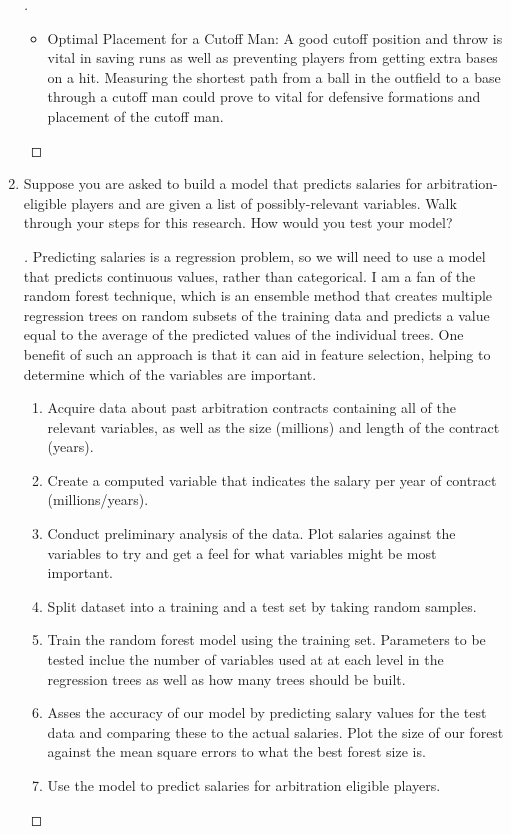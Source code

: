 \documentclass[]{article}
\theoremstyle{definition}
\begin{document}
\begin{enumerate}
\begin{proof}[\unskip\nopunct]
\begin{itemize}
		\item Optimal Placement for a Cutoff Man: A good cutoff position and throw is vital in saving runs as well as preventing players from getting extra bases on a hit. Measuring the shortest path from a ball in the outfield to a base through a cutoff man could prove to vital for defensive formations and placement of the cutoff man. 
	\end{itemize}

\end{proof}


\item Suppose you are asked to build a model that predicts salaries for arbitration-eligible players and are given a list of possibly-relevant variables. Walk through your steps for this research. How would you test your model?

\begin{proof}[\unskip\nopunct]\renewcommand{\qedsymbol}{}

Predicting salaries is a regression problem, so we will need to use a model that predicts continuous values, rather than categorical. I am a fan of the random forest technique, which is an ensemble method that creates multiple regression trees on random subsets of the training data and predicts a value equal to the average of the predicted values of the individual trees. One benefit of such an approach is that it can aid in feature selection, helping to determine which of the variables are important.

	\begin{enumerate}
		\item Acquire data about past arbitration contracts containing all of the relevant variables, as well as the size (millions) and length of the contract (years).
		\item Create a computed variable that indicates the salary per year of contract (millions/years).
		\item Conduct preliminary analysis of the data. Plot salaries against the variables to try and get a feel for what variables might be most important.
		\item Split dataset into a training and a test set by taking random samples. 
		\item Train the random forest model using the training set. Parameters to be tested inclue the number of variables used at at each level in the regression trees as well as how many trees should be built. 
		\item Asses the accuracy of our model by predicting salary values for the test data and comparing these to the actual salaries. Plot the size of our forest against the mean square errors to what the best forest size is.
		\item Use the model to predict salaries for arbitration eligible players.
	\end{enumerate}


\end{proof}
\end{enumerate}
\end{document}
